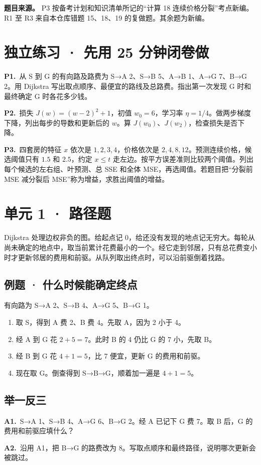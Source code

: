 \documentclass[UTF8,a4paper,11pt]{ctexart}
\newcommand{\CompactQuestion}[2]{\par\noindent\textbf{#1.}\ #2\par\vspace{.8em}}
\begin{document}
\textbf{题目来源。} P3 按备考计划和知识清单所记的“计算 18 连续价格分裂”考点新编。R1 至 R3 来自本仓库错题 15、18、19 的复做题。其余题为新编。

\section{独立练习 · 先用 25 分钟闭卷做}
\CompactQuestion{P1}{从 S 到 G 的有向路及路费为 S→A 2、S→B 5、A→B 1、A→G 7、B→G 2。用 Dijkstra 写出取点顺序、最便宜的路线及总路费。指出第一次发现 G 时和最终确定 G 时各花多少钱。}
\CompactQuestion{P2}{损失 $J(w)=(w-2)^2+1$，初值 $w_0=6$，学习率 $\eta=1/4$。做两步梯度下降，列出每步的导数和更新后的 $w$。算 $J(w_0)$、$J(w_2)$，检查损失是否下降。}
\CompactQuestion{P3}{四套房的特征 $x$ 依次是 $1,2,3,4$，价格依次是 $2,4,8,12$。预测连续价格，候选阈值只有 $1.5$ 和 $2.5$，约定 $x\le t$ 走左边。按平方误差准则比较两个阈值。列出每个候选的左右组、叶预测、总 SSE 和全体 MSE，再选阈值。若题目把“分裂前 MSE 减分裂后 MSE”称为增益，求胜出阈值的增益。}
\clearpage
\section{单元 1 · 路径题}
Dijkstra 处理边权非负的图。给起点记 0，给还没有发现的地点记无穷大。每轮从尚未确定的地点中，取当前累计花费最小的一个。经它走到邻居，只有总花费变小时才更新邻居的费用和前驱。从队列取出终点时，可以沿前驱倒着找路。

\subsection{例题 · 什么时候能确定终点}
有向路为 S→A 2、S→B 4、A→G 5、B→G 1。

\begin{enumerate}
\item 取 S，得到 A 费 2、B 费 4。先取 A，因为 2 小于 4。
\item 经 A 到 G 花 $2+5=7$。此时 B 的 4 仍比 G 的 7 小，先取 B。
\item 经 B 到 G 花 $4+1=5$，比 7 便宜，更新 G 的费用和前驱。
\item 现在取 G。倒查得到 S→B→G，顺着加一遍是 $4+1=5$。
\end{enumerate}
\subsection{举一反三}
\CompactQuestion{A1}{S→A 1、S→B 4、A→G 6、B→G 2。经 A 已记下 G 费 7。取 B 后，G 的费用和前驱应填什么？}
\CompactQuestion{A2}{沿用 A1，把 B→G 的路费改为 8。写取点顺序和最终路径，说明哪次更新会被跳过。}
\clearpage
\end{document}
